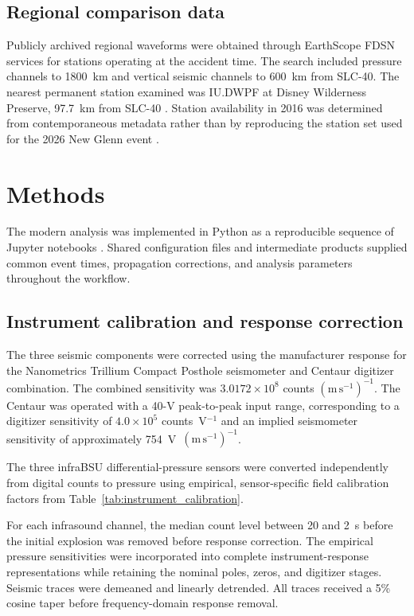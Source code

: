 \documentclass[]{seismica}
\begin{document}
\subsection{Regional comparison data}

Publicly archived regional waveforms were obtained through EarthScope FDSN
services for stations operating at the accident time. The search included
pressure channels to 1800~km and vertical seismic channels to 600~km from
SLC-40. The nearest permanent station examined was IU.DWPF at Disney
Wilderness Preserve, 97.7~km from SLC-40 \citep{asl_gsn_iu_1988}. Station
availability in 2016 was determined from contemporaneous metadata rather than
by reproducing the station set used for the 2026 New Glenn event
\citep{silber_scamfer_newglenn_2026}.


\section{Methods}
\label{sec:methods}

The modern analysis was implemented in Python as a reproducible sequence of
Jupyter notebooks \citep{kluyver2016jupyter}. Shared configuration files and
intermediate products supplied common event times, propagation corrections,
and analysis parameters throughout the workflow.


\subsection{Instrument calibration and response correction}

The three seismic components were corrected using the manufacturer response
for the Nanometrics Trillium Compact Posthole seismometer and Centaur digitizer
combination. The combined sensitivity was
$3.0172\times10^8$ counts $(\mathrm{m\,s^{-1}})^{-1}$. The Centaur was
operated with a 40-V peak-to-peak input range, corresponding to a digitizer
sensitivity of $4.0\times10^5$ counts~V$^{-1}$ and an implied seismometer
sensitivity of approximately 754~V~$(\mathrm{m\,s^{-1}})^{-1}$.

The three infraBSU differential-pressure sensors were converted independently
from digital counts to pressure using empirical, sensor-specific field
calibration factors from Table~\ref{tab:instrument_calibration}.

For each infrasound channel, the median count level between 20 and 2~s before
the initial explosion was removed before response correction. The empirical
pressure sensitivities were incorporated into complete instrument-response
representations while retaining the nominal poles, zeros, and digitizer
stages. Seismic traces were demeaned and linearly detrended. All traces received
a 5\% cosine taper before frequency-domain response removal.
\end{document}
